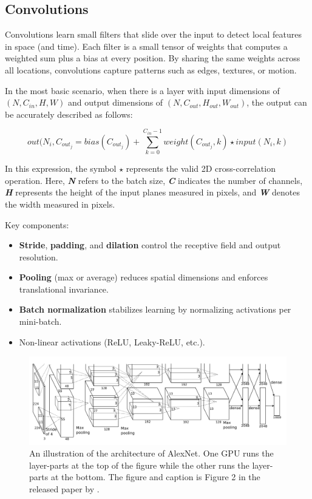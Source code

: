 \subsection{Convolutions}

Convolutions learn small filters that slide over the input to detect local features in space (and time). Each filter is a small tensor of weights that computes a weighted sum plus a bias at every position. By sharing the same weights across all locations, convolutions capture patterns such as edges, textures, or motion.  

In the most basic scenario, when there is a layer with input dimensions of \( (N, C_{in}, H, W)\) and output dimensions of \( (N, C_{out}, H_{out}, W_{out})\), the output can be accurately described as follows:

\[out(N_i, C_{out_j}=bias(C_{out_j})+\sum_{k=0}^{C_{in}-1}weight(C_{out_j},k)\star input(N_i,k)\]

In this expression, the symbol \(\star\) represents the valid 2D cross-correlation operation. Here, \textit{\textbf{N}} refers to the batch size, \textit{\textbf{C}} indicates the number of channels, \textit{\textbf{H}} represents the height of the input planes measured in pixels, and \textit{\textbf{W}} denotes the width measured in pixels. 

Key components:
\begin{itemize}
    \item \textbf{Stride}, \textbf{padding}, and \textbf{dilation} control the receptive field and output resolution.
    \item \textbf{Pooling} (max or average) reduces spatial dimensions and enforces translational invariance.
    \item \textbf{Batch normalization} stabilizes learning by normalizing activations per mini-batch.
    \item Non-linear activations (ReLU, Leaky-ReLU, etc.). 
\end{itemize}

\begin{figure}
    \centering
    \includegraphics[width=1\linewidth]{figures/alexnet.png}
    \caption{An illustration of the architecture of AlexNet. One GPU runs the layer-parts at the top of the figure while the other runs the layer-parts at the bottom. The figure and caption is Figure 2 in the released paper by \textcite{krizhevsky_alexnet}.}
    \label{fig:alexnet}
\end{figure}

